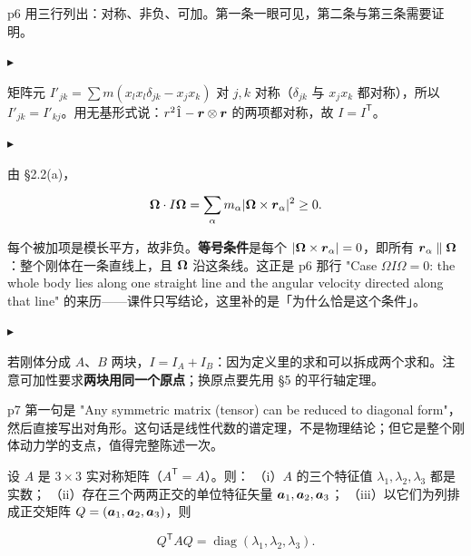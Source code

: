 \documentclass[11pt]{ctexart}
\newcommand{\step}[1]{\par\vspace{3pt}\noindent
  {\color{violet}\small$\blacktriangleright$}\hspace{3pt}{\bfseries\color{violetdeep}#1}\par\vspace{1pt}}
\begin{document}


p6 用三行列出：对称、非负、可加。第一条一眼可见，第二条与第三条需要证明。

\step{对称性：$I^{\mathsf T}=I$}
矩阵元 $I'_{jk}=\sum m(x_lx_l\delta_{jk}-x_jx_k)$ 对 $j,k$ 对称（$\delta_{jk}$ 与 $x_jx_k$ 都对称），所以 $I'_{jk}=I'_{kj}$。用无基形式说：$r^2\hat1-\boldsymbol{r}\otimes\boldsymbol{r}$ 的两项都对称，故 $I=I^{\mathsf T}$。

\step{非负性：$\vect{\Omega}\cdot I\vect{\Omega}\ge0$}
由 \S2.2(a)，

\[
\boldsymbol{\Omega}\cdot I\boldsymbol{\Omega}=\sum_\alpha m_\alpha|\boldsymbol{\Omega}\times\boldsymbol{r}_\alpha|^2\ge0 .
\]

每个被加项是模长平方，故非负。\textbf{等号条件}是每个 $|\boldsymbol{\Omega}\times\boldsymbol{r}_\alpha|=0$，即所有 $\boldsymbol{r}_\alpha\parallel\boldsymbol{\Omega}$：整个刚体在一条直线上，且 $\boldsymbol{\Omega}$ 沿这条线。这正是 p6 那行 "Case $\Omega I\Omega=0$: the whole body lies along one straight line and the angular velocity directed along that line" 的来历——课件只写结论，这里补的是「为什么恰是这个条件」。


\step{可加性}
若刚体分成 $A$、$B$ 两块，$I=I_A+I_B$：因为定义里的求和可以拆成两个求和。注意可加性要求\textbf{两块用同一个原点}；换原点要先用 \S5 的平行轴定理。



p7 第一句是 "Any symmetric matrix (tensor) can be reduced to diagonal form"，然后直接写出对角形。这句话是线性代数的谱定理，不是物理结论；但它是整个刚体动力学的支点，值得完整陈述一次。

设 $A$ 是 $3\times3$ 实对称矩阵（$A^{\mathsf T}=A$）。则：
（i）$A$ 的三个特征值 $\lambda_1,\lambda_2,\lambda_3$ 都是实数；
（ii）存在三个两两正交的单位特征矢量 $\boldsymbol{a}_1,\boldsymbol{a}_2,\boldsymbol{a}_3$；
（iii）以它们为列排成正交矩阵 $Q=(\boldsymbol{a}_1,\boldsymbol{a}_2,\boldsymbol{a}_3)$，则

\[
Q^{\mathsf T}AQ=\operatorname{diag}(\lambda_1,\lambda_2,\lambda_3).
\]
\end{document}
